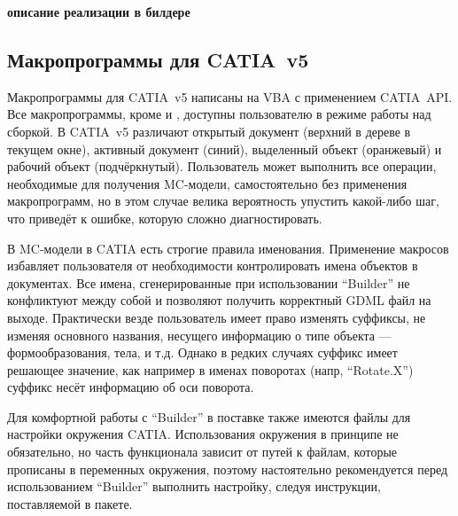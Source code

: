 \todo \textbf{описание реализации в билдере}

%                                                                         

\subsection{Макропрограммы для CATIA~v5}\label{sec:secMacros}

Макропрограммы для CATIA~v5 написаны на VBA с применением CATIA~API. Все макропрограммы, кроме  и , доступны пользователю в режиме работы над сборкой. В CATIA~v5 различают открытый документ (верхний в дереве в текущем окне), активный документ (синий), выделенный объект (оранжевый) и рабочий объект (подчёркнутый). Пользователь может выполнить все операции, необходимые для получения MC-модели, самостоятельно без применения макропрограмм, но в этом случае велика вероятность упустить какой-либо шаг, что приведёт к ошибке, которую сложно диагностировать.

В MC-модели в CATIA есть строгие правила именования. Применение макросов избавляет пользователя от необходимости контролировать имена объектов в документах. Все имена, сгенерированные при использовании ``Builder'' не конфликтуют между собой и позволяют получить корректный GDML файл на выходе. Практически везде пользователь имеет право изменять суффиксы, не изменяя основного названия, несущего информацию о типе объекта --- формообразования, тела, и т.д. Однако в редких случаях суффикс имеет решающее значение, как например в именах поворотах (напр, ``Rotate.X'') суффикс несёт информацию об оси поворота.


Для комфортной работы с ``Builder'' в поставке также имеются файлы для настройки окружения CATIA. Использования окружения в принципе не обязательно, но часть функционала зависит от путей к файлам, которые прописаны в переменных окружения, поэтому настоятельно рекомендуется перед использованием ``Builder'' выполнить настройку, следуя инструкции, поставляемой в пакете.


